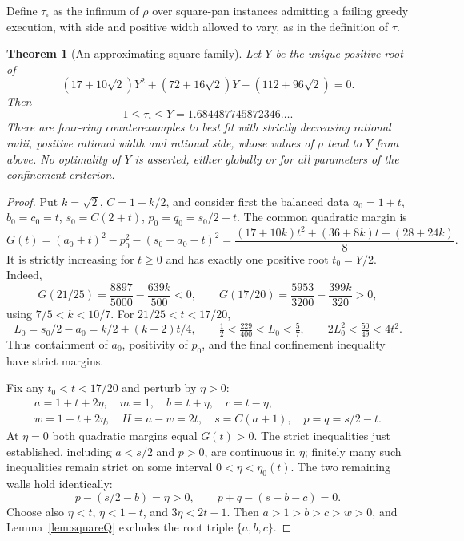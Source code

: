 \documentclass[11pt]{article}
\newtheorem{theorem}{Theorem}
\theoremstyle{definition}
\begin{document}
Define $\tau_{\square}$ as the infimum of $\rho$ over square-pan
instances admitting a failing greedy execution, with side and positive
width allowed to vary, as in the definition of $\tau$.

\begin{theorem}[An approximating square family]\label{thm:squarelimit}
Let $Y$ be the unique positive root of
\[
 (17+10\sqrt2)Y^2+(72+16\sqrt2)Y-(112+96\sqrt2)=0.
\]
Then
\[
 1\le\tau_{\square}\le Y=1.684487745872346\ldots.
\]
There are four-ring counterexamples to best fit with strictly
decreasing rational radii, positive rational width and rational side,
whose values of $\rho$ tend to $Y$ from above. No optimality of $Y$
is asserted, either globally or for all parameters of the confinement
criterion.
\end{theorem}
\begin{proof}
Put $k=\sqrt2$, $C=1+k/2$, and consider first the balanced data
$a_0=1+t$, $b_0=c_0=t$, $s_0=C(2+t)$,
$p_0=q_0=s_0/2-t$. The common quadratic margin is
\[
 G(t)=(a_0+t)^2-p_0^2-(s_0-a_0-t)^2
 =\frac{(17+10k)t^2+(36+8k)t-(28+24k)}8.
\]
It is strictly increasing for $t\ge0$ and has exactly one positive
root $t_0=Y/2$. Indeed,
\[
 G(21/25)=\frac{8897}{5000}-\frac{639k}{500}<0,
 \qquad
 G(17/20)=\frac{5953}{3200}-\frac{399k}{320}>0,
\]
using $7/5<k<10/7$. For $21/25<t<17/20$,
\[
 L_0=s_0/2-a_0=k/2+(k-2)t/4,\qquad
 \tfrac12<\tfrac{229}{400}<L_0<\tfrac57,
 \qquad 2L_0^2<\tfrac{50}{49}<4t^2.
\]
Thus containment of $a_0$, positivity of $p_0$, and the final
confinement inequality have strict margins.

Fix any $t_0<t<17/20$ and perturb by $\eta>0$:
\begin{gather*}
 a=1+t+2\eta,\quad m=1,\quad b=t+\eta,\quad c=t-\eta,\\
 w=1-t+2\eta,\quad H=a-w=2t,\quad
 s=C(a+1),\quad p=q=s/2-t.
\end{gather*}
At $\eta=0$ both quadratic margins equal $G(t)>0$. The strict
inequalities just established, including $a<s/2$ and $p>0$,
are continuous in $\eta$; finitely many such inequalities remain
strict on some interval $0<\eta<\eta_0(t)$. The two remaining
walls hold identically:
\[
 p-(s/2-b)=\eta>0,\qquad p+q-(s-b-c)=0.
\]
Choose also $\eta<t$, $\eta<1-t$, and $3\eta<2t-1$.
Then $a>1>b>c>w>0$, and Lemma~\ref{lem:squareQ} excludes the
root triple $\{a,b,c\}$.


\end{proof}
\end{document}
